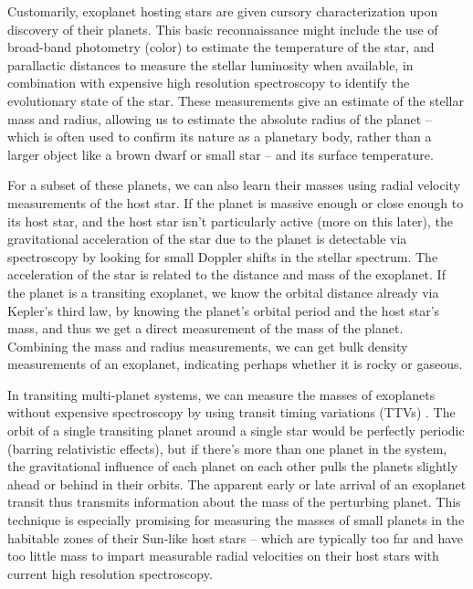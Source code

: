 Customarily, exoplanet hosting stars are given cursory characterization upon discovery of their planets. This basic reconnaissance might include the use of broad-band photometry (color) to estimate the temperature of the star, and parallactic distances to measure the stellar luminosity when available, in combination with expensive high resolution spectroscopy to identify the evolutionary state of the star. These measurements give an estimate of the stellar mass and radius, allowing us to estimate the absolute radius of the planet -- which is often used to confirm its nature as a planetary body, rather than a larger object like a brown dwarf or small star -- and its surface temperature. 

For a subset of these planets, we can also learn their masses using radial velocity measurements of the host star. If the planet is massive enough or close enough to its host star, and the host star isn't particularly active (more on this later), the gravitational acceleration of the star due to the planet is detectable via spectroscopy by looking for small Doppler shifts in the stellar spectrum. The acceleration of the star is related to the distance and mass of the exoplanet. If the planet is a transiting exoplanet, we know the orbital distance already via Kepler's third law, by knowing the planet's orbital period and the host star's mass, and thus we get a direct measurement of the mass of the planet. Combining the mass and radius measurements, we can get bulk density measurements of an exoplanet, indicating perhaps whether it is rocky or gaseous. 

In transiting multi-planet systems, we can measure the masses of exoplanets without expensive spectroscopy by using transit timing variations (TTVs) \citep{Agol2005,Holman2005}. The orbit of a single transiting planet around a single star would be perfectly periodic (barring relativistic effects), but if there's more than one planet in the system, the gravitational influence of each planet on each other pulls the planets slightly ahead or behind in their orbits. The apparent early or late arrival of an exoplanet transit thus transmits information about the mass of the perturbing planet. This technique is especially promising for measuring the masses of small planets in the habitable zones of their Sun-like host stars -- which are typically too far and have too little mass to impart measurable radial velocities on their host stars with current high resolution spectroscopy. 

